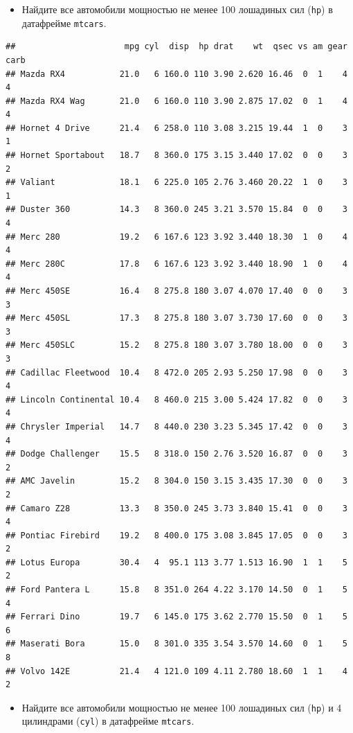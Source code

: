 \documentclass[]{book}
\providecommand{\tightlist}{%
  \setlength{\itemsep}{0pt}\setlength{\parskip}{0pt}}
\begin{document}
\begin{itemize}
\tightlist
\item
  Найдите все автомобили мощностью не менее 100 лошадиных сил
  (\texttt{hp}) в датафрейме \texttt{mtcars}.
\end{itemize}

\begin{verbatim}
##                      mpg cyl  disp  hp drat    wt  qsec vs am gear carb
## Mazda RX4           21.0   6 160.0 110 3.90 2.620 16.46  0  1    4    4
## Mazda RX4 Wag       21.0   6 160.0 110 3.90 2.875 17.02  0  1    4    4
## Hornet 4 Drive      21.4   6 258.0 110 3.08 3.215 19.44  1  0    3    1
## Hornet Sportabout   18.7   8 360.0 175 3.15 3.440 17.02  0  0    3    2
## Valiant             18.1   6 225.0 105 2.76 3.460 20.22  1  0    3    1
## Duster 360          14.3   8 360.0 245 3.21 3.570 15.84  0  0    3    4
## Merc 280            19.2   6 167.6 123 3.92 3.440 18.30  1  0    4    4
## Merc 280C           17.8   6 167.6 123 3.92 3.440 18.90  1  0    4    4
## Merc 450SE          16.4   8 275.8 180 3.07 4.070 17.40  0  0    3    3
## Merc 450SL          17.3   8 275.8 180 3.07 3.730 17.60  0  0    3    3
## Merc 450SLC         15.2   8 275.8 180 3.07 3.780 18.00  0  0    3    3
## Cadillac Fleetwood  10.4   8 472.0 205 2.93 5.250 17.98  0  0    3    4
## Lincoln Continental 10.4   8 460.0 215 3.00 5.424 17.82  0  0    3    4
## Chrysler Imperial   14.7   8 440.0 230 3.23 5.345 17.42  0  0    3    4
## Dodge Challenger    15.5   8 318.0 150 2.76 3.520 16.87  0  0    3    2
## AMC Javelin         15.2   8 304.0 150 3.15 3.435 17.30  0  0    3    2
## Camaro Z28          13.3   8 350.0 245 3.73 3.840 15.41  0  0    3    4
## Pontiac Firebird    19.2   8 400.0 175 3.08 3.845 17.05  0  0    3    2
## Lotus Europa        30.4   4  95.1 113 3.77 1.513 16.90  1  1    5    2
## Ford Pantera L      15.8   8 351.0 264 4.22 3.170 14.50  0  1    5    4
## Ferrari Dino        19.7   6 145.0 175 3.62 2.770 15.50  0  1    5    6
## Maserati Bora       15.0   8 301.0 335 3.54 3.570 14.60  0  1    5    8
## Volvo 142E          21.4   4 121.0 109 4.11 2.780 18.60  1  1    4    2
\end{verbatim}

\begin{itemize}
\tightlist
\item
  Найдите все автомобили мощностью не менее 100 лошадиных сил
  (\texttt{hp}) и 4 цилиндрами (\texttt{cyl}) в датафрейме
  \texttt{mtcars}.
\end{itemize}
\end{document}
